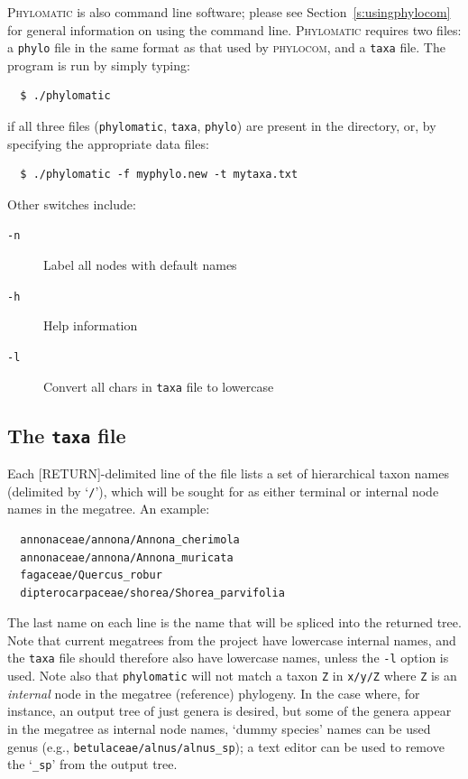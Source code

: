 \documentclass[12pt,letterpaper]{article}
\begin{document}
{\scshape Phylomatic} is also command line software; please see
Section~\ref{s:usingphylocom} for general information on using the
command line.  {\scshape Phylomatic} requires two files: a
\texttt{phylo} file in the same format as that used by {\scshape
  phylocom}, and a \texttt{taxa} file.  The program is run by simply
typing:
\begin{verbatim}
  $ ./phylomatic
\end{verbatim}
if all three files (\texttt{phylomatic}, \texttt{taxa},
\texttt{phylo}) are present in the directory, or, by specifying the
appropriate data files:
\begin{verbatim}
  $ ./phylomatic -f myphylo.new -t mytaxa.txt
\end{verbatim}  
Other switches include:
\begin{description}
  \item[\texttt{-n}] Label all nodes with default names
  \item[\texttt{-h}] Help information
  \item[\texttt{-l}] Convert all chars in \texttt{taxa} file to lowercase
\end{description}

\subsection{The \texttt{taxa} file}

Each [RETURN]-delimited line of the file lists a set of hierarchical
taxon names (delimited by `\texttt{/}'), which will be sought for as
either terminal or internal node names in the megatree.  An example:
\begin{verbatim}
  annonaceae/annona/Annona_cherimola
  annonaceae/annona/Annona_muricata
  fagaceae/Quercus_robur
  dipterocarpaceae/shorea/Shorea_parvifolia
\end{verbatim}
The last name on each line is the name that will be spliced into the
returned tree.  Note that current megatrees from the
project have lowercase internal names, and the \texttt{taxa} file
should therefore also have lowercase names, unless the \texttt{-l}
option is used.  Note also that \texttt{phylomatic} will not match a
taxon \texttt{Z} in \texttt{x/y/Z} where \texttt{Z} is an {\it
  internal} node in the megatree (reference) phylogeny. In the case
where, for instance, an output tree of just genera is desired, but
some of the genera appear in the megatree as internal node names,
`dummy species' names can be used genus (e.g.,
\texttt{betulaceae/alnus/alnus\_sp}); a text editor can be used to
remove the `\texttt{\_sp}' from the output tree.
\end{document}
